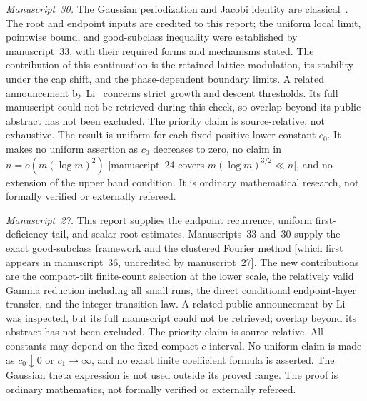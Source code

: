 \documentclass[11pt,a4paper]{article}
\theoremstyle{definition}\newaliascnt{definition}{theorem}
\theoremstyle{remark}\newaliascnt{remark}{theorem}
\begin{document}
\emph{Manuscript~30.} The Gaussian periodization and Jacobi identity are
classical~\cite{jg:DLMF}. The root and endpoint inputs are credited to this
report; the uniform local limit, pointwise bound, and good-subclass inequality
were established by manuscript~33, with their required forms and mechanisms
stated. The contribution of this continuation is the retained lattice
modulation, its stability under the cap shift, and the phase-dependent boundary
limits. A related announcement by Li~\cite{jg:Li} concerns strict growth and
descent thresholds. Its full manuscript could not be retrieved during this
check, so overlap beyond its public abstract has not been excluded. The priority
claim is source-relative, not exhaustive. The result is uniform for each fixed
positive lower constant $c_0$. It makes no uniform assertion as $c_0$ decreases
to zero, no claim in $n=o(m(\log m)^2)$ [manuscript~24 covers
$m(\log m)^{3/2}\ll n$], and no extension of the upper band condition. It is
ordinary mathematical research, not formally verified or externally refereed.

\emph{Manuscript~27.} This report supplies the endpoint recurrence, uniform
first-deficiency tail, and scalar-root estimates. Manuscripts~33 and~30 supply
the exact good-subclass framework and the clustered Fourier method [which first
appears in manuscript~36, uncredited by manuscript~27]. The new contributions
are the compact-tilt finite-count selection at the lower scale, the relatively
valid Gamma reduction including all small runs, the direct conditional
endpoint-layer transfer, and the integer transition law. A related public
announcement by Li~\cite{jg:Li} was inspected, but its full manuscript could not
be retrieved; overlap beyond its abstract has not been excluded. The priority
claim is source-relative. All constants may depend on the fixed compact $c$
interval. No uniform claim is made as $c_0\downarrow0$ or $c_1\to\infty$, and no
exact finite coefficient formula is asserted. The Gaussian theta expression is
not used outside its proved range. The proof is ordinary mathematics, not
formally verified or externally refereed.
\end{document}
